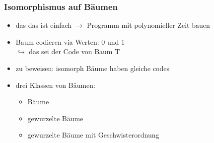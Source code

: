 \subsubsection{Isomorphismus auf Bäumen}
\begin{itemize}
	\item das \glqq das ist einfach\grqq{} $\rightarrow$ Programm mit polynomieller Zeit bauen
	\item Baum codieren via Werten: 0 und 1\\
\hspace*{2cm}$\hookrightarrow$ das sei der Code von Baum T
	\item zu beweisen: isomorph Bäume haben gleiche codes
	\item drei Klassen von Bäumen:
	\begin{itemize}
		\item Bäume
		\item gewurzelte Bäume
		\item gewurzelte Bäume mit Geschwisterordnung
	\end{itemize}
\end{itemize}
\newpage

